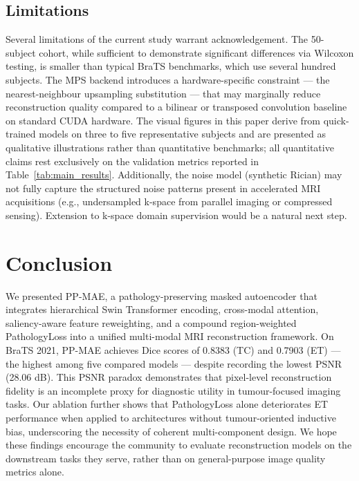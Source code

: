 \documentclass[conference]{IEEEtran}
\begin{document}
\subsection{Limitations}

Several limitations of the current study warrant acknowledgement.
The 50-subject cohort, while sufficient to demonstrate significant
differences via Wilcoxon testing, is smaller than typical BraTS
benchmarks, which use several hundred subjects. The MPS
backend introduces a hardware-specific constraint — the
nearest-neighbour upsampling substitution — that may marginally
reduce reconstruction quality compared to a bilinear or
transposed convolution baseline on standard CUDA hardware. The
visual figures in this paper derive from quick-trained models
on three to five representative subjects and are presented as
qualitative illustrations rather than quantitative benchmarks;
all quantitative claims rest exclusively on the validation
metrics reported in Table~\ref{tab:main_results}.
Additionally, the noise model (synthetic Rician) may not fully
capture the structured noise patterns present in accelerated MRI
acquisitions (e.g., undersampled k-space from parallel imaging
or compressed sensing). Extension to k-space domain supervision
would be a natural next step.

\section{Conclusion}

We presented PP-MAE, a pathology-preserving masked autoencoder
that integrates hierarchical Swin Transformer encoding,
cross-modal attention, saliency-aware feature reweighting, and
a compound region-weighted PathologyLoss into a unified
multi-modal MRI reconstruction framework. On BraTS 2021, PP-MAE
achieves Dice scores of 0.8383 (TC) and 0.7903 (ET) — the
highest among five compared models — despite recording the lowest
PSNR (28.06 dB). This PSNR paradox demonstrates that pixel-level
reconstruction fidelity is an incomplete proxy for diagnostic
utility in tumour-focused imaging tasks. Our ablation further
shows that PathologyLoss alone deteriorates ET performance when
applied to architectures without tumour-oriented inductive bias,
underscoring the necessity of coherent multi-component design.
We hope these findings encourage the community to evaluate
reconstruction models on the downstream tasks they serve, rather
than on general-purpose image quality metrics alone.
\end{document}
